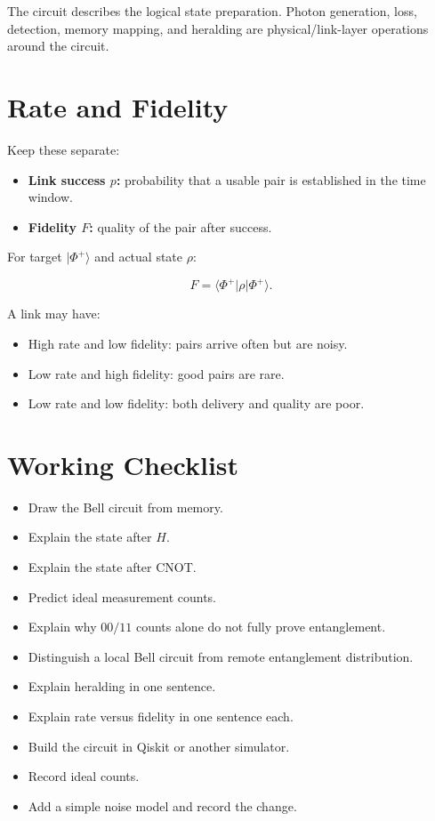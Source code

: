 \documentclass[11pt]{article}
\newcommand{\unchecked}{\(\square\)}
\begin{document}
The circuit describes the logical state preparation. Photon generation, loss, detection, memory mapping, and heralding are physical/link-layer operations around the circuit.

\section{Rate and Fidelity}

Keep these separate:

\begin{itemize}
    \item \textbf{Link success \(p\):} probability that a usable pair is established in the time window.
    \item \textbf{Fidelity \(F\):} quality of the pair after success.
\end{itemize}

For target \( |\Phi^+\rangle \) and actual state \(\rho\):

\[
F=\langle\Phi^+|\rho|\Phi^+\rangle.
\]

A link may have:

\begin{itemize}
    \item High rate and low fidelity: pairs arrive often but are noisy.
    \item Low rate and high fidelity: good pairs are rare.
    \item Low rate and low fidelity: both delivery and quality are poor.
\end{itemize}

\section{Working Checklist}

\begin{itemize}[leftmargin=*]
    \item[\unchecked] Draw the Bell circuit from memory.
    \item[\unchecked] Explain the state after \(H\).
    \item[\unchecked] Explain the state after CNOT.
    \item[\unchecked] Predict ideal measurement counts.
    \item[\unchecked] Explain why \(00/11\) counts alone do not fully prove entanglement.
    \item[\unchecked] Distinguish a local Bell circuit from remote entanglement distribution.
    \item[\unchecked] Explain heralding in one sentence.
    \item[\unchecked] Explain rate versus fidelity in one sentence each.
    \item[\unchecked] Build the circuit in Qiskit or another simulator.
    \item[\unchecked] Record ideal counts.
    \item[\unchecked] Add a simple noise model and record the change.
\end{itemize}
\end{document}
